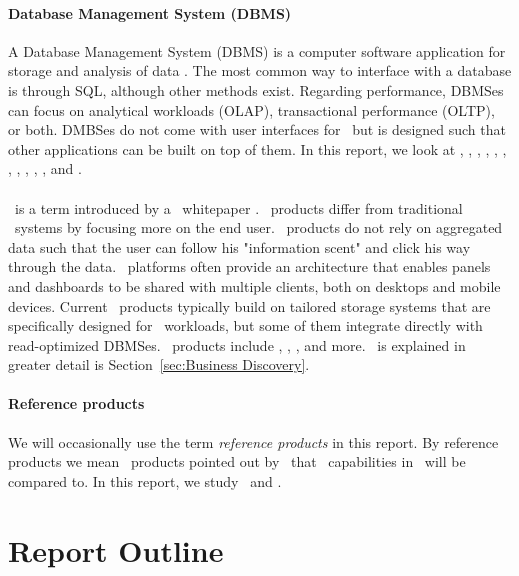 \paragraph{Database Management System (DBMS)}
\label{par:Database Management System (DBMS)}
A Database Management System (DBMS) is a computer software application for storage and analysis of data \cite{Wikipedia_contributors2015-pb}. The most common way to interface with a database is through SQL, although other methods exist. Regarding performance, DBMSes can focus on analytical workloads (OLAP), transactional performance (OLTP), or both. DMBSes do not come with user interfaces for \bd~but is designed such that other applications can be built on top of them. In this report, we look at \oracle, \ibm, \saph, \sapnw, \mssql, \cstore, \vertica, \blink, \exasol, \oracle, \hyper, and \hyrise.

\paragraph{\bd}
\label{par:Business Discovery}
\bd~is a term introduced by a \qlikview~whitepaper \cite{Qlik2014-vd}. \bd~products differ from traditional \bi~systems by focusing more on the end user. \bd~products do not rely on aggregated data such that the user can follow his "information scent" and click his way through the data. \bd~platforms often provide an architecture that enables panels and dashboards to be shared with multiple clients, both on desktops and mobile devices. Current \bd~products typically build on tailored storage systems that are specifically designed for \bd~workloads, but some of them integrate directly with read-optimized DBMSes. \bd~products include \tableau, \qlikview, \powerpivot, and more. \bd~is explained in greater detail is Section~\ref{sec:Business Discovery}.

\paragraph{Reference products}
\label{par:Reference products}
We will occasionally use the term \textit{reference products} in this report. By reference products we mean \bd~products pointed out by \genus~that \bd~capabilities in \genusSoftware~will be compared to. In this report, we study \qlikview~and \tableau.


\section{Report Outline}
\label{sec:Report Outline}



